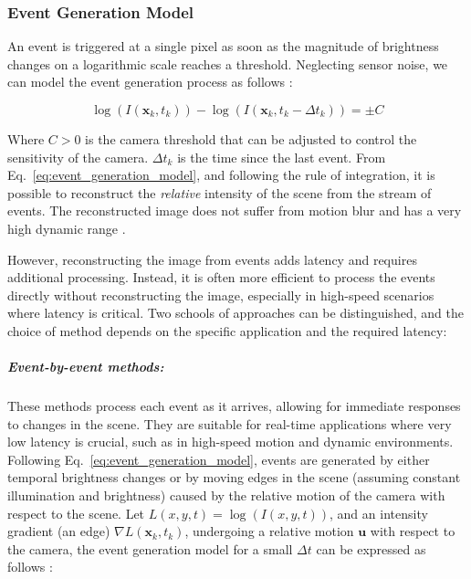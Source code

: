 \documentclass{article}
\begin{document}
\subsubsection{Event Generation Model}\label{sec:event_generation_model}
An event is triggered at a single pixel as soon as the magnitude of brightness changes on a logarithmic scale reaches a threshold. Neglecting sensor noise, we can model the event generation process as follows \cite{gallegoEventbasedVisionSurvey2022}:

\begin{equation}\label{eq:event_generation_model}
    \log(I(\textbf{x}_k,t_k)) - \log(I(\textbf{x}_k,t_k-\Delta t_k)) = \pm C
\end{equation}
    
Where $C>0$ is the camera threshold that can be adjusted to control the sensitivity of the camera. $\Delta t_k$ is the time since the last event. From Eq.~\eqref{eq:event_generation_model}, and following the rule of integration, it is possible to reconstruct the \textit{relative} intensity of the scene from the stream of events. The reconstructed image does not suffer from motion blur and has a very high dynamic range \cite{rebecqHighSpeedHigh2019}. 

However, reconstructing the image from events adds latency and requires additional processing. Instead, it is often more efficient to process the events directly without reconstructing the image, especially in high-speed scenarios where latency is critical. Two schools of approaches can be distinguished, and the choice of method depends on the specific application and the required latency:

\subparagraph{Event-by-event methods:} These methods process each event as it arrives, allowing for immediate responses to changes in the scene. They are suitable for real-time applications where very low latency is crucial, such as in high-speed motion and dynamic environments. Following Eq.~\eqref{eq:event_generation_model}, events are generated by either temporal brightness changes or by moving edges in the scene (assuming constant illumination and brightness) caused by the relative motion of the camera with respect to the scene. Let $L(x,y,t)=\log(I(x,y,t))$, and an intensity gradient (an edge) $\nabla L(\textbf{x}_k,t_k)$, undergoing a relative motion $\textbf{u}$ with respect to the camera, the event generation model for a small $\Delta t$ can be expressed as follows \cite{gallegoEventbasedVisionSurvey2022, gallegoEventbasedCameraPose2015}:
\end{document}
